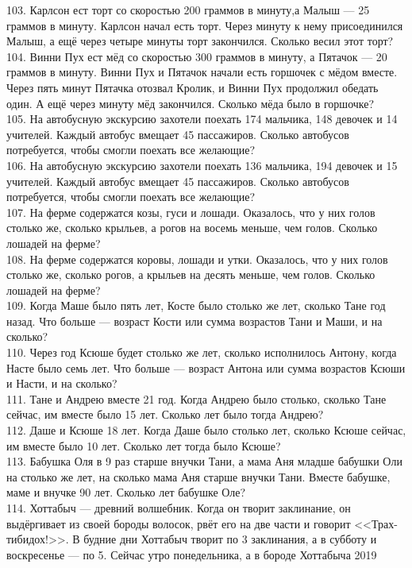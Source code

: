 \documentclass[12pt]{article}
\begin{document}
103. Карлсон ест торт со скоростью 200 граммов в минуту,а Малыш --- 25 граммов в минуту. Карлсон начал есть торт. Через минуту к нему присоединился Малыш, а ещё через четыре минуты торт закончился. Сколько весил этот торт?\\
104. Винни Пух ест мёд со скоростью 300 граммов в минуту, а Пятачок --- 20 граммов в минуту. Винни Пух и Пятачок начали есть горшочек с мёдом вместе. Через пять минут Пятачка отозвал Кролик, и Винни Пух продолжил обедать один. А ещё через минуту мёд закончился. Сколько мёда было в горшочке?\\
105. На автобусную экскурсию захотели поехать 174 мальчика, 148 девочек и 14 учителей. Каждый автобус вмещает 45 пассажиров. Сколько автобусов потребуется, чтобы смогли поехать все желающие?\\
106. На автобусную экскурсию захотели поехать 136 мальчика, 194 девочек и 15 учителей. Каждый автобус вмещает 45 пассажиров. Сколько автобусов потребуется, чтобы смогли поехать все желающие?\\
107. На ферме содержатся козы, гуси и лошади. Оказалось, что у них голов столько же, сколько крыльев, а рогов на восемь меньше, чем голов. Сколько лошадей на ферме?\\
108. На ферме содержатся коровы, лошади и утки. Оказалось, что у них голов столько же, сколько рогов, а крыльев на десять меньше, чем голов. Сколько лошадей на ферме?\\
109. Когда Маше было пять лет, Косте было столько же лет, сколько Тане год назад. Что больше --- возраст Кости или сумма возрастов Тани и Маши, и на сколько?\\
110. Через год Ксюше будет столько же лет, сколько исполнилось Антону, когда Насте было семь лет. Что больше --- возраст Антона или сумма возрастов Ксюши и Насти, и на сколько?\\
111. Тане и Андрею вместе 21 год. Когда Андрею было столько, сколько Тане сейчас, им вместе было 15 лет. Сколько лет было тогда Андрею?\\
112. Даше и Ксюше 18 лет. Когда Даше было столько лет, сколько Ксюше сейчас, им вместе было 10 лет. Сколько лет тогда было Ксюше?\\
113. Бабушка Оля в 9 раз старше внучки Тани, а мама Аня младше бабушки Оли на столько же лет, на сколько мама Аня старше внучки Тани. Вместе бабушке, маме и внучке 90 лет. Сколько лет бабушке Оле?\\
114. Хоттабыч --- древний волшебник. Когда он творит заклинание, он выдёргивает из своей бороды волосок, рвёт его на две части и говорит <<Трах-тибидох!>>. В будние дни Хоттабыч творит по 3 заклинания, а в субботу и воскресенье --- по 5. Сейчас утро понедельника, а в бороде Хоттабыча 2019
\end{document}
